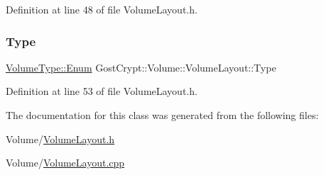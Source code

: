 Definition at line 48 of file Volume\+Layout.\+h.

\mbox{\label{class_gost_crypt_1_1_volume_1_1_volume_layout_a2746f54b98f99c2f3fec77ef73d24699}} 
\subsubsection{\texorpdfstring{Type}{Type}}
{\footnotesize\ttfamily \hyperlink{struct_gost_crypt_1_1_volume_1_1_volume_type_a7fe1979dab76d4534dcb1e26179d4717}{Volume\+Type\+::\+Enum} Gost\+Crypt\+::\+Volume\+::\+Volume\+Layout\+::\+Type\hspace{0.3cm}{\ttfamily [protected]}}



Definition at line 53 of file Volume\+Layout.\+h.



The documentation for this class was generated from the following files\+:\begin{DoxyCompactItemize}
\item 
Volume/\hyperlink{_volume_layout_8h}{Volume\+Layout.\+h}\item 
Volume/\hyperlink{_volume_layout_8cpp}{Volume\+Layout.\+cpp}\end{DoxyCompactItemize}
